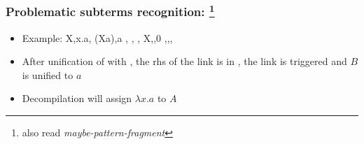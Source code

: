 \documentclass{pres}
\begin{document}
\begin{frame}[fragile]
  \frametitle{Problematic subterms recognition: \maybelam\footnote{also read \textit{maybe-pattern-fragment}}}

  \begin{itemize}
    \item Example: 
      \printAlll
      {{{X,\lambda x.a},
        {(X\appsep a),a}}}
      {{{, },
        {,}}}
      {{{X,,0}}}
      {{{\llambda,,,}}}
    \item After unification of  with , 
        the rhs of the link is in \llambda,
        the link is triggered and $B$ is unified to $a$
    \item Decompilation will assign $\lambda x.a$ to $A$
  \end{itemize}

\end{frame}


  

\end{document}

